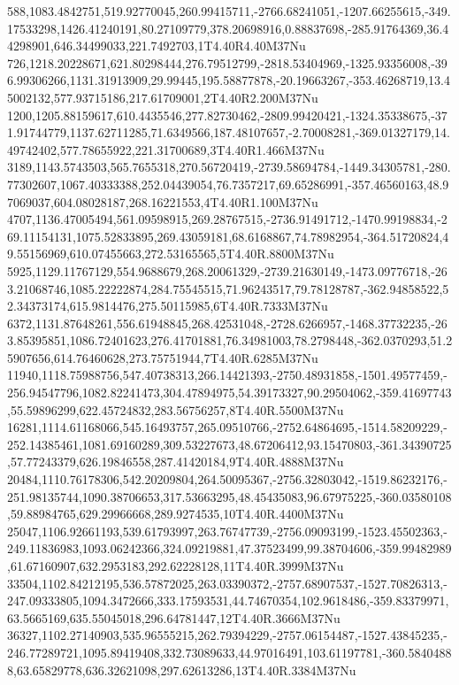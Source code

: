 588,1083.4842751,519.92770045,260.99415711,-2766.68241051,-1207.66255615,-349.17533298,1426.41240191,80.27109779,378.20698916,0.88837698,-285.91764369,36.44298901,646.34499033,221.7492703,1T4.40R4.40M37Nu
726,1218.20228671,621.80298444,276.79512799,-2818.53404969,-1325.93356008,-396.99306266,1131.31913909,29.99445,195.58877878,-20.19663267,-353.46268719,13.45002132,577.93715186,217.61709001,2T4.40R2.200M37Nu
1200,1205.88159617,610.4435546,277.82730462,-2809.99420421,-1324.35338675,-371.91744779,1137.62711285,71.6349566,187.48107657,-2.70008281,-369.01327179,14.49742402,577.78655922,221.31700689,3T4.40R1.466M37Nu
3189,1143.5743503,565.7655318,270.56720419,-2739.58694784,-1449.34305781,-280.77302607,1067.40333388,252.04439054,76.7357217,69.65286991,-357.46560163,48.97069037,604.08028187,268.16221553,4T4.40R1.100M37Nu
4707,1136.47005494,561.09598915,269.28767515,-2736.91491712,-1470.99198834,-269.11154131,1075.52833895,269.43059181,68.6168867,74.78982954,-364.51720824,49.55156969,610.07455663,272.53165565,5T4.40R.8800M37Nu
5925,1129.11767129,554.9688679,268.20061329,-2739.21630149,-1473.09776718,-263.21068746,1085.22222874,284.75545515,71.96243517,79.78128787,-362.94858522,52.34373174,615.9814476,275.50115985,6T4.40R.7333M37Nu
6372,1131.87648261,556.61948845,268.42531048,-2728.6266957,-1468.37732235,-263.85395851,1086.72401623,276.41701881,76.34981003,78.2798448,-362.0370293,51.25907656,614.76460628,273.75751944,7T4.40R.6285M37Nu
11940,1118.75988756,547.40738313,266.14421393,-2750.48931858,-1501.49577459,-256.94547796,1082.82241473,304.47894975,54.39173327,90.29504062,-359.41697743,55.59896299,622.45724832,283.56756257,8T4.40R.5500M37Nu
16281,1114.61168066,545.16493757,265.09510766,-2752.64864695,-1514.58209229,-252.14385461,1081.69160289,309.53227673,48.67206412,93.15470803,-361.34390725,57.77243379,626.19846558,287.41420184,9T4.40R.4888M37Nu
20484,1110.76178306,542.20209804,264.50095367,-2756.32803042,-1519.86232176,-251.98135744,1090.38706653,317.53663295,48.45435083,96.67975225,-360.03580108,59.88984765,629.29966668,289.9274535,10T4.40R.4400M37Nu
25047,1106.92661193,539.61793997,263.76747739,-2756.09093199,-1523.45502363,-249.11836983,1093.06242366,324.09219881,47.37523499,99.38704606,-359.99482989,61.67160907,632.2953183,292.62228128,11T4.40R.3999M37Nu
33504,1102.84212195,536.57872025,263.03390372,-2757.68907537,-1527.70826313,-247.09333805,1094.3472666,333.17593531,44.74670354,102.9618486,-359.83379971,63.5665169,635.55045018,296.64781447,12T4.40R.3666M37Nu
36327,1102.27140903,535.96555215,262.79394229,-2757.06154487,-1527.43845235,-246.77289721,1095.89419408,332.73089633,44.97016491,103.61197781,-360.58404888,63.65829778,636.32621098,297.62613286,13T4.40R.3384M37Nu
